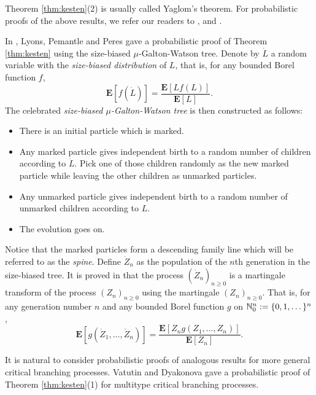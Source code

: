 \documentclass[12pt]{amsart}
\numberwithin{equation}{section}
\newcommand{\defn}[1]{{\em #1}}
\newcommand{\expr}[1]{\left( #1 \right)}
\newcommand{\brac}[1]{\left[ #1 \right]}
\newcommand{\expct}{\mathbf E}
\begin{document}
	Theorem \ref{thm:kesten}(2) is usually called Yaglom's theorem.
	For probabilistic proofs of the above results, we refer our readers to 
\cite{geiger1999elementary}, \cite{geiger2000new} and \cite{lyons1995conceptual}.
\par
	In \cite{lyons1995conceptual}, Lyons, Pemantle and Peres gave a probabilistic proof of Theorem \ref{thm:kesten} using the size-biased $\mu$-Galton-Watson tree.
	Denote by $\dot L$ a random variable with the \defn{size-biased distribution} of $L$, that is, for any bounded Borel function $f$,
\begin{equation*}
		\expct\brac{f\expr{\dot L}}
	=
		\frac{\expct\brac{Lf(L)}}{\expct\brac{L}}.
\end{equation*}
	The celebrated \defn{size-biased $\mu$-Galton-Watson tree} is then constructed as follows:
\begin{itemize}
\item
	There is an initial particle which is marked.
\item
	Any marked particle gives independent birth to a random number of children according to $\dot L$. Pick one of those children randomly as the new marked particle while leaving the other children as unmarked particles.
\item
	Any unmarked particle gives independent birth to a random number of unmarked children according to $L$.
\item
	The evolution goes on.
\end{itemize}
\par
	Notice that the marked particles form a descending family line which will be referred to as the \defn{spine}.
	Define $\dot Z_n$ as the population of the $n$th generation in the size-biased tree.
	It is proved in \cite{lyons1995conceptual} that the process $(\dot Z_n)_{n\ge 0}$ is a martingale transform of the process $(Z_n)_{n\ge 0}$ using the martingale $(Z_n)_{n\ge 0}.$
	That is, for any generation number $n$ and any bounded Borel function $g$ on $\mathbb N_0^{n} := \{0,1,\dots\}^n$,
\begin{equation}
\label{eq:htransformation}
				\expct\brac{g\expr{\dot Z_1,\dots,\dot Z_n}}
	=
                \frac{\expct\brac{Z_n g\expr{Z_1,\dots, Z_n}}}{\expct\brac{Z_n}}.
\end{equation}
\par
	It is natural to consider probabilistic proofs of analogous results for more general critical branching processes. Vatutin and  Dyakonova \cite{VD} gave a probabilistic proof of Theorem \ref{thm:kesten}(1) for multitype critical branching processes.
\end{document}
